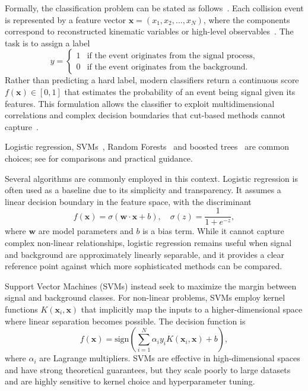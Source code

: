 Formally, the classification problem can be stated as follows~\cite{Hastie2009}. Each collision event is represented by a feature vector $\mathbf{x} = (x_1, x_2, \ldots, x_N)$, where the components correspond to reconstructed kinematic variables or high-level observables~\cite{CMS:PF2017,pedregosa_scikit-learn_2011}. The task is to assign a label
\begin{equation}
y =
\begin{cases}
1 & \text{if the event originates from the signal process}, \\
0 & \text{if the event originates from the background}.
\end{cases}
\end{equation}
Rather than predicting a hard label, modern classifiers return a continuous score $f(\mathbf{x}) \in [0,1]$ that estimates the probability of an event being signal given its features. This formulation allows the classifier to exploit multidimensional correlations and complex decision boundaries that cut-based methods cannot capture~\cite{Cranmer2015,Guest2018}.

Logistic regression, SVMs~\cite{Cortes1995}, Random Forests~\cite{Breiman2001} and boosted trees~\cite{friedman_greedy_2001,chen_xgboost_2016} are common choices; see \cite{Hastie2009,Hoecker2007} for comparisons and practical guidance.

Several algorithms are commonly employed in this context. Logistic regression is often used as a baseline due to its simplicity and transparency. It assumes a linear decision boundary in the feature space, with the discriminant
\begin{equation}
f(\mathbf{x}) = \sigma(\mathbf{w} \cdot \mathbf{x} + b), \quad 
\sigma(z) = \frac{1}{1 + e^{-z}},
\end{equation}
where $\mathbf{w}$ are model parameters and $b$ is a bias term. While it cannot capture complex non-linear relationships, logistic regression remains useful when signal and background are approximately linearly separable, and it provides a clear reference point against which more sophisticated methods can be compared.

Support Vector Machines (SVMs) instead seek to maximize the margin between signal and background classes. For non-linear problems, SVMs employ kernel functions $K(\mathbf{x}_i, \mathbf{x})$ that implicitly map the inputs to a higher-dimensional space where linear separation becomes possible. The decision function is
\begin{equation}
f(\mathbf{x}) = \text{sign}\left(\sum_{i=1}^{N} \alpha_i y_i K(\mathbf{x}_i, \mathbf{x}) + b\right),
\end{equation}
where $\alpha_i$ are Lagrange multipliers. SVMs are effective in high-dimensional spaces and have strong theoretical guarantees, but they scale poorly to large datasets and are highly sensitive to kernel choice and hyperparameter tuning.

